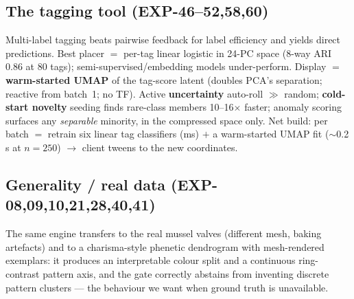 \documentclass[11pt]{article}
\begin{document}
\subsection{The tagging tool (EXP-46--52,58,60)}
Multi-label tagging beats pairwise feedback for label efficiency and yields direct predictions. Best placer $=$
per-tag linear logistic in 24-PC space (8-way ARI 0.86 at 80 tags); semi-supervised/embedding models
under-perform. Display $=$ \textbf{warm-started UMAP} of the tag-score latent (doubles PCA's separation;
reactive from batch~1; no TF). Active \textbf{uncertainty} auto-roll $\gg$ random; \textbf{cold-start novelty}
seeding finds rare-class members 10--16$\times$ faster; anomaly scoring surfaces any \emph{separable} minority,
in the compressed space only. Net build: per batch $=$ retrain six linear tag classifiers (ms) $+$ a
warm-started UMAP fit ($\sim$0.2\,s at $n{=}250$) $\rightarrow$ client tweens to the new coordinates.

\subsection{Generality / real data (EXP-08,09,10,21,28,40,41)}
The same engine transfers to the real mussel valves (different mesh, baking artefacts) and to a charisma-style
phenetic dendrogram with mesh-rendered exemplars: it produces an interpretable colour split and a continuous
ring-contrast pattern axis, and the gate correctly abstains from inventing discrete pattern clusters --- the
behaviour we want when ground truth is unavailable.
\end{document}
